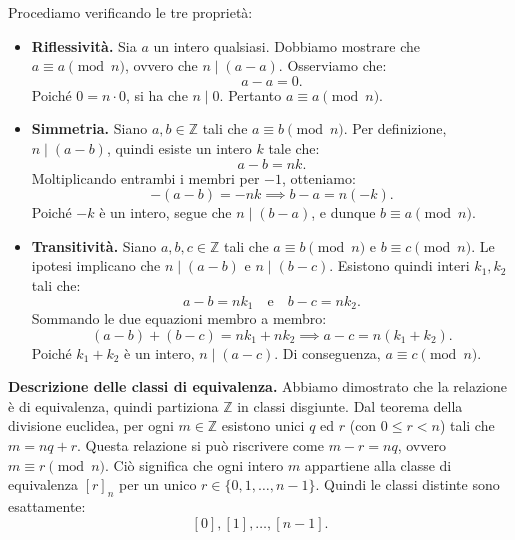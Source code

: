\begin{thmpf}

Procediamo verificando le tre proprietà:

\begin{itemize}
    \item \textbf{Riflessività.} Sia \( a \) un intero qualsiasi.
    Dobbiamo mostrare che \( a \equiv a \pmod n \), ovvero che \( n \mid (a - a) \).
    Osserviamo che:
    \[
    a - a = 0.
    \]
    Poiché \( 0 = n \cdot 0 \), si ha che \( n \mid 0 \). Pertanto \( a \equiv a \pmod n \).

    \item \textbf{Simmetria.} Siano \( a, b \in \mathbb{Z} \) tali che \( a \equiv b \pmod n \).
    Per definizione, \( n \mid (a - b) \), quindi esiste un intero \( k \) tale che:
    \[
    a - b = nk.
    \]
    Moltiplicando entrambi i membri per \(-1\), otteniamo:
    \[
    -(a - b) = -nk \implies b - a = n(-k).
    \]
    Poiché \(-k\) è un intero, segue che \( n \mid (b - a) \), e dunque \( b \equiv a \pmod n \).

    \item \textbf{Transitività.} Siano \( a, b, c \in \mathbb{Z} \) tali che \( a \equiv b \pmod n \) e \( b \equiv c \pmod n \).
    Le ipotesi implicano che \( n \mid (a - b) \) e \( n \mid (b - c) \). Esistono quindi interi \( k_1, k_2 \) tali che:
    \[
    a - b = n k_1 \quad \text{e} \quad b - c = n k_2.
    \]
    Sommando le due equazioni membro a membro:
    \[
    (a - b) + (b - c) = n k_1 + n k_2 \implies a - c = n(k_1 + k_2).
    \]
    Poiché \( k_1 + k_2 \) è un intero, \( n \mid (a - c) \). Di conseguenza, \( a \equiv c \pmod n \).
\end{itemize}

\medskip
\textbf{Descrizione delle classi di equivalenza.}
Abbiamo dimostrato che la relazione è di equivalenza, quindi partiziona \(\mathbb{Z}\) in classi disgiunte.
Dal teorema della divisione euclidea, per ogni \(m \in \mathbb{Z}\) esistono unici \(q\) ed \(r\) (con \(0 \le r < n\)) tali che \(m = nq + r\).
Questa relazione si può riscrivere come \(m - r = nq\), ovvero \(m \equiv r \pmod n\).
Ciò significa che ogni intero \(m\) appartiene alla classe di equivalenza \([r]_n\) per un unico \(r \in \{0, 1, \dots, n-1\}\).
Quindi le classi distinte sono esattamente:
\[
[0], [1], \dots, [n-1].
\]
\end{thmpf}

